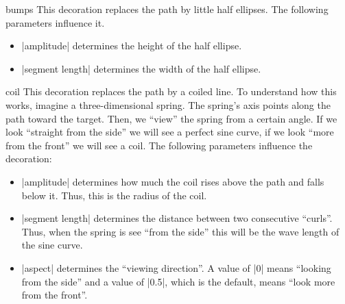 \begin{decoration}{bumps}
    This decoration replaces the path by little half ellipses. The following
    parameters influence it.
    \begin{itemize}
        \item |amplitude| determines the height of the half ellipse.
        \item |segment length| determines the width of the half ellipse.
    \end{itemize}
\begin{codeexample}[preamble={\usetikzlibrary{decorations.pathmorphing}}]
\end{codeexample}
\end{decoration}

\begin{decoration}{coil}
    This decoration replaces the path by a coiled line. To understand how this
    works, imagine a three-dimensional spring. The spring's axis points along
    the path toward the target. Then, we ``view'' the spring from a certain
    angle. If we look ``straight from the side'' we will see a perfect sine
    curve, if we look ``more from the front'' we will see a coil. The following
    parameters influence the decoration:
    \begin{itemize}
        \item |amplitude| determines how much the coil rises above the path and
            falls below it. Thus, this is the radius of the coil.
        \item |segment length| determines the distance between two consecutive
            ``curls''. Thus, when the spring is see ``from the side'' this will
            be the wave length of the sine curve.
        \item |aspect| determines the ``viewing direction''. A value of |0|
            means ``looking from the side'' and a value of |0.5|, which is the
            default, means ``look more from the front''.
    \end{itemize}
\begin{codeexample}[preamble={\usetikzlibrary{decorations.pathmorphing}}]
\end{codeexample}
\begin{codeexample}[preamble={\usetikzlibrary{decorations.pathmorphing}}]
\end{codeexample}
\end{decoration}

